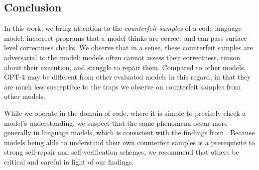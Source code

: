 \subsection{Conclusion}
In this work, we bring attention to the \textit{counterfeit samples} of a code language model: incorrect programs that a model thinks are correct and can pass surface-level correctness checks. We observe that in a sense, these counterfeit samples are adversarial to the model: models often cannot assess their correctness, reason about their execution, and struggle to repair them. Compared to other models, GPT-4 may be different from other evaluated models in this regard, in that they are much less susceptible to the traps we observe on counterfeit samples from other models.

While we operate in the domain of code, where it is simple to precisely check a model's understanding, we suspect that the same phenomena occur more generally in language models, which is consistent with the findings from \citet{west2023generative}. Because models being able to understand their own counterfeit samples is a prerequisite to strong self-repair and self-verification schemes, we recommend that others be critical and careful in light of our findings.


